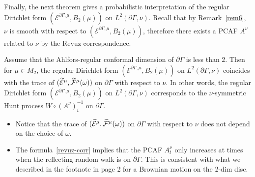 \documentclass[AHL,Unicode,longabstracts,published]{cedram}
\newcommand{\ce}{\mathcal{E}}
\newcommand{\cf}{\mathcal{F}}
\let\oldtilde\tilde
\renewcommand*{\tilde}[1]{\mathchoice{\widetilde{#1}}{\widetilde{#1}}{\oldtilde{#1}}{\oldtilde{#1}}}
\begin{document}
Finally, the next theorem gives a probabilistic interpretation of the regular Dirichlet form $(\ce^{\partial\Gamma,\mu},B_2(\mu))$ on $L^2(\partial\Gamma,\nu)$. Recall that by Remark~\ref{rem6}, $\nu$ is smooth with respect to $(\ce^{\partial\Gamma,\mu},B_2(\mu))$, therefore there exists a PCAF $A^{\nu}$ related to $\nu$ by the Revuz correspondence.

\begin{theo}\label{trace}
Assume that the Ahlfors-regular conformal dimension of $\partial\Gamma$ is less than 2. Then for $\mu\in M_2$, the regular Dirichlet form $(\ce^{\partial\Gamma,\mu},B_2(\mu))$ on $L^2(\partial\Gamma,\nu)$ coincides with the trace of $(\tilde\ce^{\mu}, \tilde\cf^{\mu}(\omega))$ on $\partial\Gamma$ with respect to $\nu$. In other words, the regular Dirichlet form $(\ce^{\partial\Gamma,\mu},B_2(\mu))$ on $L^2(\partial\Gamma,\nu)$ corresponds to the $\nu$-symmetric Hunt process $W\circ (A^{\nu})_t^{-1}$ on $\partial\Gamma$.
\end{theo}

\begin{rema}\leavevmode
\begin{itemize}
\item Notice that the trace of $(\tilde\ce^{\mu}, \tilde\cf^{\mu}(\omega))$ on $\partial\Gamma$ with respect to $\nu$ does not depend on the choice of $\omega$.
\item The formula~\eqref{revuz-corr} implies that the PCAF $A^{\nu}_t$ only increases at times when the reflecting random walk is on $\partial\Gamma$. This is consistent with what we described in the footnote in page 2 for a Brownian motion on the 2-dim disc.
\end{itemize}
\end{rema}
\end{document}
